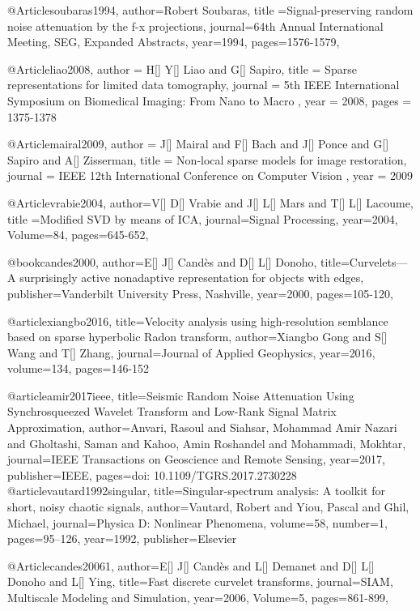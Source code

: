 {@Article{soubaras1994,
  author={Robert Soubaras},
  title ={Signal-preserving random noise attenuation by the f-x projections},
  journal={64th Annual International Meeting, SEG, Expanded Abstracts},
  year=1994,
  pages={1576-1579},
}

@Article{liao2008,
  author = 	 {H[] Y[] Liao and G[] Sapiro},
  title = 	 {Sparse representations for limited data tomography},
  journal = 	 {5th IEEE International Symposium on Biomedical Imaging: From Nano to Macro },
  year = 	 2008,
  pages = 	 {1375-1378}}

@Article{mairal2009,
  author = 	 {J[] Mairal and F[] Bach and J[] Ponce and G[] Sapiro and A[] Zisserman},
  title = 	 {Non-local sparse models for image restoration},
  journal = 	 {IEEE 12th International Conference on Computer Vision  },
  year = 	 2009}


@Article{vrabie2004,
  author={V[] D[] Vrabie and J[] L[] Mars and T[] L[] Lacoume},
  title ={Modified SVD by means of ICA},
  journal={Signal Processing},
  year=2004,
  Volume=84,
  pages={645-652},
}

@book{candes2000,
  author={E[] J[] Cand\`{e}s and D[] L[] Donoho},
  title={Curvelets—A surprisingly active nonadaptive representation for objects with edges},
  publisher={Vanderbilt University Press, Nashville},
  year=2000,
    pages={105-120},
}



@article{xiangbo2016,
  title={Velocity analysis using high-resolution semblance based on sparse hyperbolic Radon transform},
  author={Xiangbo Gong and S[] Wang and T[] Zhang},
  journal={Journal of Applied Geophysics},
  year={2016},
  volume=134,
  pages={146-152}
}



@article{amir2017ieee,
  title={Seismic Random Noise Attenuation Using Synchrosqueezed Wavelet Transform and Low-Rank Signal Matrix Approximation},
  author={Anvari, Rasoul and Siahsar, Mohammad Amir Nazari and Gholtashi, Saman and Kahoo, Amin Roshandel and Mohammadi, Mokhtar},
  journal={IEEE Transactions on Geoscience and Remote Sensing},
  year={2017},
  publisher={IEEE},
  pages={doi: 10.1109/TGRS.2017.2730228}
}
@article{vautard1992singular,
  title={Singular-spectrum analysis: A toolkit for short, noisy chaotic signals},
  author={Vautard, Robert and Yiou, Pascal and Ghil, Michael},
  journal={Physica D: Nonlinear Phenomena},
  volume={58},
  number={1},
  pages={95--126},
  year={1992},
  publisher={Elsevier}
}


@Article{candes20061,
  author={E[] J[] Cand\`{e}s and L[] Demanet and D[] L[] Donoho and L[] Ying},
  title={Fast discrete curvelet transforms},
  journal={SIAM, Multiscale Modeling and Simulation},
  year=2006,
  Volume=5,
  pages={861-899},
}

}
